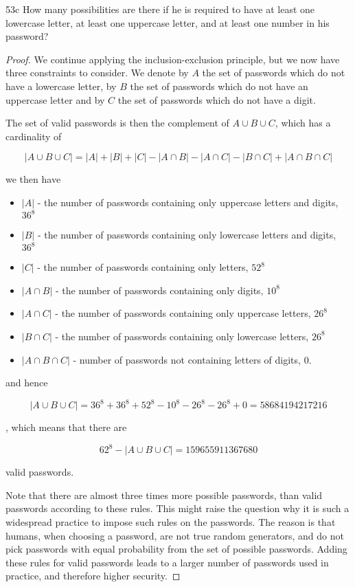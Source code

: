 \begin{exercise}{53c}
    How many possibilities are there if he is required to have at least one lowercase letter, at least one uppercase letter, and at least one number in his password?
\end{exercise}

\begin{proof}
    We continue applying the inclusion-exclusion principle, but we now have three constraints to consider. We denote by $A$ the set of passwords which do not have a lowercase letter, by $B$ the set of passwords which do not have an uppercase letter and by $C$ the set of passwords which do not have a digit.

    The set of valid passwords is then the complement of $A \cup B \cup C$, which has a cardinality of

    $$|A \cup B \cup C| = |A| + |B| + |C| - |A \cap B| - |A \cap C| - |B \cap C| + |A \cap B \cap C| $$

    we then have

    \begin{itemize}
        \item $|A|$ - the number of passwords containing only uppercase letters and digits, $36^8$
        \item $|B|$ - the number of passwords containing only lowercase letters and digits, $36^8$
        \item $|C|$ - the number of passwords containing only letters, $52^8$
        \item $|A\cap B|$ - the number of passwords containing only digits, $10^8$
        \item $|A\cap C|$ - the number of passwords containing only uppercase letters, $26^8$
        \item $|B\cap C|$ - the number of passwords containing only lowercase letters, $26^8$
        \item $|A \cap B \cap C|$ - number of passwords not containing letters of digits, 0.
    \end{itemize}

    and hence

    $$|A \cup B \cup C| = 36^8 + 36^8 + 52^8 - 10^8 - 26^8-26^8+0 = 58684194217216$$

    , which means that there are

    $$62^8 - |A \cup B \cup C| = 159655911367680$$

    valid passwords.

    \vspace{1em}

    Note that there are almost three times more possible passwords, than valid passwords according to these rules. This might raise the question why it is such a widespread practice to impose such rules on the passwords. The reason is that humans, when choosing a password, are not true random generators, and do not pick passwords with equal probability from the set of possible passwords. Adding these rules for valid passwords leads to a larger number of passwords used in practice, and therefore higher security.

\end{proof}

